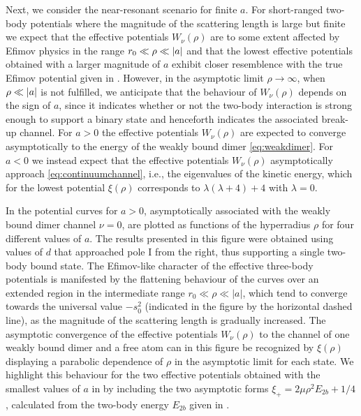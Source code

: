 Next, we consider the near-resonant scenario for finite $a$. For short-ranged two-body potentials where the magnitude of the scattering length is large but finite we expect that the effective potentials $W_{\nu}(\rho)$ are to some extent affected by Efimov physics in the range $r_0 \ll \rho \ll \lvert a\rvert$ and that the lowest effective potentials obtained with a larger magnitude of $a$ exhibit closer resemblence with the true Efimov potential given in . However, in the asymptotic limit $\rho \rightarrow \infty$, when $\rho \ll \lvert a\rvert$ is not fulfilled, we anticipate that the behaviour of $W_{\nu}(\rho)$ depends on the sign of $a$, since it indicates whether or not the two-body interaction is strong enough to support a binary state and henceforth indicates the associated break-up channel. For $a>0$ the effective potentials $W_{\nu}(\rho)$ are expected to converge asymptotically to the energy of the weakly bound dimer \eqref{eq:weakdimer}. For $a<0$ we instead expect that the effective potentials $W_{\nu}(\rho)$ asymptotically approach \eqref{eq:continuumchannel}, i.e., the eigenvalues of the kinetic energy, which for the lowest potential $\xi(\rho)$ corresponds to $\lambda(\lambda + 4) + 4$ with $\lambda = 0$.

In  the potential curves for $a>0$, asymptotically associated with the weakly bound dimer channel $\nu = 0$, are plotted as functions of the hyperradius $\rho$ for four different values of $a$. The results presented in this figure were obtained using values of $d$ that approached pole $\mathrm{I}$ from the right, thus supporting a single two-body bound state. The Efimov-like character of the effective three-body potentials is manifested by the flattening behaviour of the curves over an extended region in the intermediate range $r_0 \ll \rho \ll |a|$, which tend to converge towards the universal value $-s_0^2$ (indicated in the figure by the horizontal dashed line), as the magnitude of the scattering length is gradually increased. The asymptotic convergence of the effective potentials $W_{\nu}(\rho)$ to the channel of one weakly bound dimer and a free atom can in this figure be recognized by $\xi(\rho)$ displaying a parabolic dependence of $\rho$ in the asymptotic limit for each state. We highlight this behaviour for the two effective potentials obtained with the smallest values of $a$ in  by including the two asymptotic forms $\xi_+ = 2\mu \rho^2 E_{2b} + 1/4$, calculated from the two-body energy $E_{2b}$ given in .   

